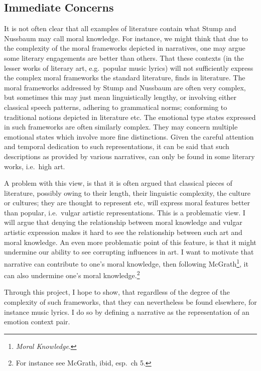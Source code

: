 \documentclass[phdthesis,12pt,final]{wuthesis}
\theoremstyle{definition}
\theoremstyle{definition}
\theoremstyle{definition}
\theoremstyle{definition}
\theoremstyle{remark}
\begin{document}
\subsection*{Immediate Concerns}\label{immediate-concerns}

It is not often clear that all examples of literature contain what Stump and Nussbaum may call moral knowledge. For instance, we might think that due to the complexity of the moral frameworks depicted in narratives, one may argue some literary engagements are better than others. That these contexts (in the lesser works of literary art, e.g.~popular music lyrics) will not sufficiently express the complex moral frameworks the standard literature, finds in literature. The moral frameworks addressed by Stump and Nussbaum are often very complex, but sometimes this may just mean linguistically lengthy, or involving either classical speech patterns, adhering to grammatical norms; conforming to traditional notions depicted in literature etc. The emotional type states expressed in such frameworks are often similarly complex. They may concern multiple emotional states which involve more fine distinctions. Given the careful attention and temporal dedication to such representations, it can be said that such descriptions as provided by various narratives, can only be found in some literary works, i.e.~high art.

A problem with this view, is that it is often argued that classical pieces of literature, possibly owing to their length, their linguistic complexity, the culture or cultures; they are thought to represent etc, will express moral features better than popular, i.e.~vulgar artistic representations. This is a problematic view. I will argue that denying the relationship between moral knowledge and vulgar artistic expression makes it hard to see the relationship between such art and moral knowledge. An even more problematic point of this feature, is that it might undermine our ability to see corrupting influences in art. I want to motivate that narrative can contribute to one's moral knowledge, then following McGrath\footnote{\emph{Moral {Knowledge}}.}, it can also undermine one's moral knowledge.\footnote{For instance see McGrath, ibid, esp.~ch 5.}

Through this project, I hope to show, that regardless of the degree of the complexity of such frameworks, that they can nevertheless be found elsewhere, for instance music lyrics. I do so by defining a narrative as the representation of an emotion context pair.
\end{document}

